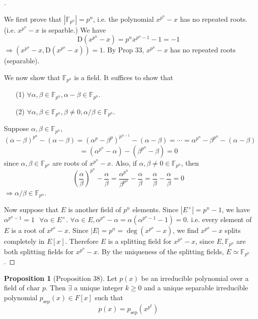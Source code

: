 \documentclass{article}
\newcommand{\sfa}{\text{  } \forall}
\theoremstyle{definition}
\newtheorem{prop}{Proposition}
\newenvironment{proofs}[1][\proofname]{%
  \begin{proof}[#1]$ $\par\nobreak\ignorespaces
}{%
  \end{proof}
}
\begin{document}
\begin{proofs}
	We first prove that $|\mathbb{F}_{p^n}| = p^n$, i.e. the polynomial $x^{p^n} - x$ has no repeated roots.(i.e. $x^{p^n} - x$ is separble.)
	We have
	\[
		\mathrm{D}(x^{p^n} - x) = p^n x^{p^n - 1} - 1 = -1
	\]
	$\Rightarrow (x^{p^n} - x, \mathrm{D} (x^{p^n} - x)) = 1$.
	By Prop 33, $x^{p^n} - x$ has no repeated roots (separable).
	
	We now show that $\mathbb{F}_{p^n}$ is a field.
	It suffices to show that
	\begin{enumerate}
		\item[(1)] $\forall \alpha, \beta \in \mathbb{F}_{p^n}, \alpha - \beta \in \mathbb{F}_{p^n}$.

		\item[(2)] $\forall \alpha, \beta \in \mathbb{F}_{p^n}, \beta \neq 0, \alpha/\beta \in \mathbb{F}_{p^n}$.
	\end{enumerate}
	Suppose $\alpha, \beta \in \mathbb{F}_{p^n}$, 
	\[
		(\alpha - \beta)^{p^n} - (\alpha - \beta) = (\alpha^p - \beta^p)^{p^{n - 1}} - (\alpha - \beta) = \cdots = \alpha^{p^n} - \beta^{p^n} - (\alpha - \beta)
	\]
	\[
		= (\alpha^{p^n} - \alpha) - (\beta^{p^n} - \beta) = 0
	\]
	since $\alpha, \beta \in \mathbb{F}_{p^n}$ are roots of $x^{p^n} - x$.
	Also, if $\alpha, \beta \neq 0 \in \mathbb{F}_{p^n}$, then
	\[
		\left(\frac{\alpha}{\beta}\right)^{p^n} - \frac{\alpha}{\beta} = \frac{\alpha^{p^n}}{\beta^{p^n}} - \frac{\alpha}{\beta} = \frac{\alpha}{\beta} - \frac{\alpha}{\beta} = 0
	\]
	$\Rightarrow \alpha/\beta \in \mathbb{F}_{p^n}$.
	\par Now suppose that $E$ is another field of $p^n$ elements.
	Since $|E^\times| = p^n - 1$, we have $\alpha^{p^n - 1} = 1 \sfa \alpha \in E^\times$.
	$\forall \alpha \in E, \alpha^{p^n} - \alpha = \alpha(\alpha^{p^n - 1} - 1) = 0$.
	i.e. every element of $E$ is a root of $x^{p^n} - x$.
	Since $|E| = p^n = \deg(x^{p^n} - x)$, we find $x^{p^n} - x$ splits completely in $E[x]$.
	Therefore $E$ is a splitting field for $x^{p^n} - x$, since $E, \mathbb{F}_{p^n}$ are both splitting fields for $x^{p^n} - x$.
	By the uniqueness of the splitting fields, $E \simeq \mathbb{F}_{p^n}$.
\end{proofs}

\begin{prop}[Proposition 38]
	Let $p(x)$ be an irreducible polynomial over a field of $\text{char } p$.
	Then $\exists$ a unique integer $k \geq 0$ and a unique separable irreducible polynomial $p_{\text{sep}}(x) \in F[x]$ such that 
	\[
		p(x) = p_{\text{sep}}(x^{p^k})
	\]
\end{prop}
\end{document}
